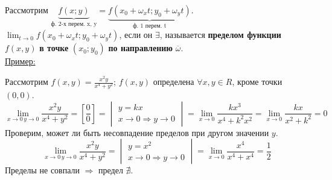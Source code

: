 \documentclass[12pt]{article}
\let\ORIincludegraphics\includegraphics
\renewcommand{\includegraphics}[2][]{\ORIincludegraphics[scale=0.65,#1]{#2}}
\begin{document}
    \noindent
    Рассмотрим $\underbrace{f(x; y)}_{\text{ф. 2-х перем. x, y}} = \underbrace{f(x_0+\omega_xt; y_0+\omega_yt)}_{\text{ф. 1 перем. t}}$.
    $\lim_{t \to 0} f(x_0+\omega_xt; y_0+\omega_yt)$, если он $\exists$, называется \textbf{пределом функции} $f(x, y)$ \textbf{в точке} $(x_0; y_0)$ \textbf{по направлению} $\overline{\omega}$.\\
    \underline{Пример:}
    \begin{adjustwidth}{1.5em}{1.5em}
        Рассмотрим $f(x,y) = \frac{x^2y}{x^4 + y^2}$; $f(x,y)$ определена $\forall x, y \in R$, кроме точки $(0, 0)$.
        \[ \lim_{x \to 0\,y \to 0} \frac{x^2y}{x^4 + y^2} = \left[ \frac{0}{0} \right] = \begin{vmatrix}
            y = kx\\
            x \to 0 \Rightarrow y \to 0
        \end{vmatrix} = \lim_{x\to 0} \frac{kx^3}{x^4+k^2x^2} = \lim_{x \to 0}\frac{kx}{x^2+k^2} = 0 \]
        Проверим, может ли быть несовпадение пределов при другом значении $y$.
        \[ \lim_{x \to 0\,y \to 0} \frac{x^2y}{x^4 + y^2} = \begin{vmatrix}
            y = x^2\\
            x \to 0 \Rightarrow y \to 0
        \end{vmatrix} = \lim_{x \to 0}\frac{x^4}{x^4+x^4} = \frac{1}{2} \]
        Пределы не совпали $\Rightarrow$ предел $\nexists$.
    \end{adjustwidth}
\end{document}
